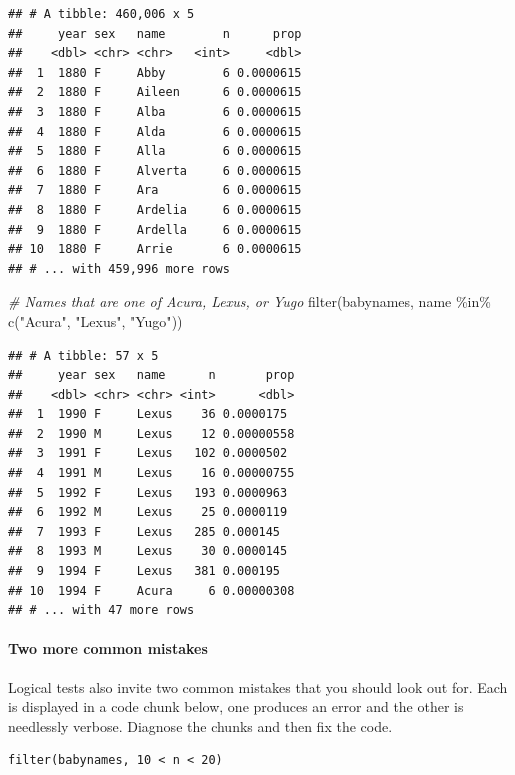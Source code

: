 \documentclass[
]{article}
\newenvironment{Shaded}{\begin{snugshade}}{\end{snugshade}}
\newcommand{\CommentTok}[1]{\textcolor[rgb]{0.56,0.35,0.01}{\textit{#1}}}
\newcommand{\FunctionTok}[1]{\textcolor[rgb]{0.00,0.00,0.00}{#1}}
\newcommand{\NormalTok}[1]{#1}
\newcommand{\SpecialCharTok}[1]{\textcolor[rgb]{0.00,0.00,0.00}{#1}}
\newcommand{\StringTok}[1]{\textcolor[rgb]{0.31,0.60,0.02}{#1}}
\begin{document}
\begin{verbatim}
## # A tibble: 460,006 x 5
##     year sex   name        n      prop
##    <dbl> <chr> <chr>   <int>     <dbl>
##  1  1880 F     Abby        6 0.0000615
##  2  1880 F     Aileen      6 0.0000615
##  3  1880 F     Alba        6 0.0000615
##  4  1880 F     Alda        6 0.0000615
##  5  1880 F     Alla        6 0.0000615
##  6  1880 F     Alverta     6 0.0000615
##  7  1880 F     Ara         6 0.0000615
##  8  1880 F     Ardelia     6 0.0000615
##  9  1880 F     Ardella     6 0.0000615
## 10  1880 F     Arrie       6 0.0000615
## # ... with 459,996 more rows
\end{verbatim}

\begin{Shaded}
\begin{Highlighting}[]
\CommentTok{\# Names that are one of Acura, Lexus, or Yugo}
\FunctionTok{filter}\NormalTok{(babynames, name }\SpecialCharTok{\%in\%} \FunctionTok{c}\NormalTok{(}\StringTok{"Acura"}\NormalTok{, }\StringTok{"Lexus"}\NormalTok{, }\StringTok{"Yugo"}\NormalTok{))}
\end{Highlighting}
\end{Shaded}

\begin{verbatim}
## # A tibble: 57 x 5
##     year sex   name      n       prop
##    <dbl> <chr> <chr> <int>      <dbl>
##  1  1990 F     Lexus    36 0.0000175 
##  2  1990 M     Lexus    12 0.00000558
##  3  1991 F     Lexus   102 0.0000502 
##  4  1991 M     Lexus    16 0.00000755
##  5  1992 F     Lexus   193 0.0000963 
##  6  1992 M     Lexus    25 0.0000119 
##  7  1993 F     Lexus   285 0.000145  
##  8  1993 M     Lexus    30 0.0000145 
##  9  1994 F     Lexus   381 0.000195  
## 10  1994 F     Acura     6 0.00000308
## # ... with 47 more rows
\end{verbatim}

\hypertarget{two-more-common-mistakes}{%
\paragraph{Two more common mistakes}\label{two-more-common-mistakes}}

Logical tests also invite two common mistakes that you should look out
for. Each is displayed in a code chunk below, one produces an error and
the other is needlessly verbose. Diagnose the chunks and then fix the
code.

\begin{verbatim}
filter(babynames, 10 < n < 20)
\end{verbatim}
\end{document}
